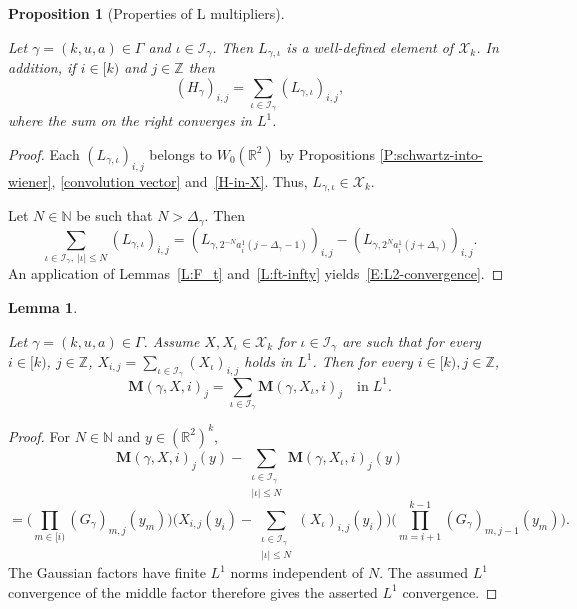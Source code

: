\documentclass[12pt,reqno]{amsart}
\theoremstyle{plain}
\newtheorem{lemma}[theorem]{Lemma}
\newtheorem{proposition}[theorem]{Proposition}
\numberwithin{equation}{section}
\theoremstyle{remark}
\newcommand{\uses}[1]{}
\newcommand{\usesdefs}[1]{}
\newcommand{\leanok}{}
\newcommand{\lean}[1]{}
\newcommand{\Z}{{\mathbb Z}}
\newcommand{\R}{{\mathbb R}}
\newcommand{\N}{{\mathbb N}}
\begin{document}
\begin{proposition}[Properties of L multipliers]\label{sum L multiplier convergence-L1}
\lean{Auto.sumLMultiplierConvergenceL1}
\leanok
\uses{P:schwartz-into-wiener,convolution vector,H-in-X,L:F_t,L:ft-infty}\usesdefs{auto:Wiener-space-definition,geometric parameters,double sequence of 2D functions,H multiplier,auto:L-kernel-definition,L multiplier,summation-definition}
Let $\gamma=(k,u,a)\in \Gamma$ and $\iota \in\mathcal{I}_{\gamma}$. Then
 $L_{\gamma,\iota}$ is a well-defined element of $\mathcal{X}_k$. In addition, if $i
\in [k)$ and $j\in \Z$ then
\begin{equation}\label{E:L2-convergence}
(H_{\gamma})_{i,j} = \sum_{\iota \in\mathcal{I}_{\gamma}} (L_{\gamma,\iota})_{i,j},
\end{equation}
where the sum on the right converges in $L^1$.
\end{proposition}

\begin{proof}
Each
$(L_{\gamma,\iota})_{i,j}$ belongs to $W_0(\R^2)$ by Propositions \ref{P:schwartz-into-wiener}, \ref{convolution vector} and~\ref{H-in-X}. Thus, $L_{\gamma,\iota}\in \mathcal{X}_k$.

Let $N\in \N$ be such that $N>\Delta_\gamma$. Then
\[
\sum_{\iota \in\mathcal{I}_{\gamma}, ~|\iota| \leq N} (L_{\gamma,\iota})_{i,j}
=(L_{\gamma,2^{-N} a_i^1(j-\Delta_\gamma-1)})_{i,j}-(L_{\gamma,2^{N} a_i^1(j+\Delta_\gamma)})_{i,j}.
\]
An application of Lemmas~\ref{L:F_t} and~\ref{L:ft-infty} yields~\eqref{E:L2-convergence}.
\end{proof}

\begin{lemma}\label{sandwich sums L1}
\lean{Auto.sandwichSumsL1}
\leanok
\uses{}\usesdefs{geometric parameters,double sequence of 2D functions,2D Gaussians,sandwich kernel,L multiplier,summation-definition}
Let $\gamma=(k,u,a)\in \Gamma$.
Assume $X, X_\iota\in \mathcal{X}_k$ for $\iota\in \mathcal{I}_{\gamma}$ are such that for every $i\in [k)$, $j\in\Z$, $X_{i,j}=\sum_{\iota\in \mathcal{I}_{\gamma}} (X_\iota)_{i,j}$ holds in $L^1$.
Then for every $i\in [k), j\in\Z$,
\begin{equation}\label{auto:H-kernel-L-decomposition} \mathbf{M}(\gamma,X,i)_j = \sum_{\iota\in \mathcal{I}_{\gamma}} \mathbf{M}(\gamma,X_\iota,i)_j\quad\text{in}\;L^1.\end{equation}
\end{lemma}

\begin{proof}
For $N\in\N$ and $y\in(\R^2)^k$,
\[
\mathbf M(\gamma,X,i)_j(y)-
\sum_{\substack{\iota\in\mathcal I_\gamma\\|\iota|\le N}}
\mathbf M(\gamma,X_\iota,i)_j(y)
\]
\[
=
\Big(\prod_{m\in[i)}(G_\gamma)_{m,j}(y_m)\Big)
\Big(X_{i,j}(y_i)-
\sum_{\substack{\iota\in\mathcal I_\gamma\\|\iota|\le N}}
(X_\iota)_{i,j}(y_i)\Big)
\Big(\prod_{m=i+1}^{k-1}(G_\gamma)_{m,j-1}(y_m)\Big).
\]
The Gaussian factors have finite $L^1$ norms independent of $N$. The assumed $L^1$ convergence of the middle factor therefore gives the asserted $L^1$ convergence.
\end{proof}
\end{document}
